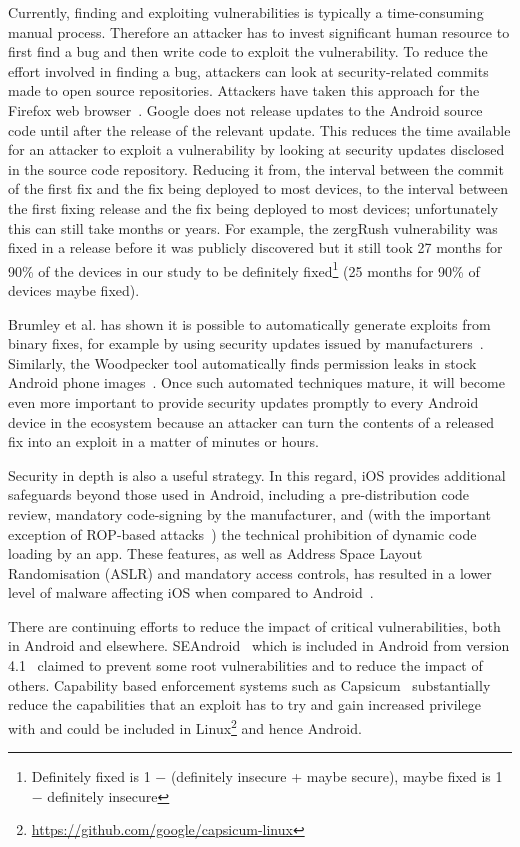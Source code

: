 \documentclass{llncs}
\begin{document}
Currently, finding and exploiting vulnerabilities is typically a time-consuming manual process.
Therefore an attacker has to invest significant human resource to first find a bug and then write code to exploit the vulnerability.
To reduce the effort involved in finding a bug, attackers can look at security-related commits made to open source repositories.
Attackers have taken this approach for the Firefox web browser~\cite{Barth2011}.
Google does not release updates to the Android source code until after the release of the relevant update.
This reduces the time available for an attacker to exploit a vulnerability by looking at security updates disclosed in the source code repository.
Reducing it from, the interval between the commit of the first fix and the fix being deployed to most devices, to the interval between the first fixing release and the fix being deployed to most devices; unfortunately this can still take months or years.
For example, the zergRush vulnerability was fixed in a release before it was publicly discovered but it still took 27 months for 90\% of the devices in our study to be definitely fixed\footnote{Definitely fixed is 1 $-$ (definitely insecure + maybe secure), maybe fixed is 1 $-$ definitely insecure} (25 months for 90\% of devices maybe fixed).

Brumley et al. has shown it is possible to automatically generate exploits from binary fixes, for example by using security updates issued by manufacturers~\cite{Brumley2008}. 
Similarly, the Woodpecker tool automatically finds permission leaks in stock Android phone images~\cite{Grace2012}.
Once such automated techniques mature, it will become even more important to provide security updates promptly to every Android device in the ecosystem because an attacker can turn the contents of a released fix into an exploit in a matter of minutes or hours.

Security in depth is also a useful strategy.
In this regard, iOS provides additional safeguards beyond those used in Android, including a pre-distribution code review, mandatory code-signing by the manufacturer, and (with the important exception of ROP-based attacks~\cite{Wang2013a}) the technical prohibition of dynamic code loading by an app.
These features, as well as Address Space Layout Randomisation (ASLR) and mandatory access controls, has resulted in a lower level of malware affecting iOS when compared to Android~\cite{Felt2011}.

There are continuing efforts to reduce the impact of critical vulnerabilities, both in Android and elsewhere.
SEAndroid~\cite{Smalley2013} which is included in Android from version 4.1~\cite{jelly-bean-release} claimed to prevent some root vulnerabilities and to reduce the impact of others.
Capability based enforcement systems such as Capsicum~\cite{Watson2010} substantially reduce the capabilities that an exploit has to try and gain increased privilege with and could be included in Linux\footnote{\url{https://github.com/google/capsicum-linux}} and hence Android.
\end{document}
